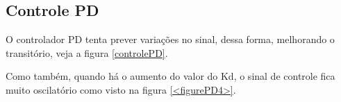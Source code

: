 \documentclass[a4paper,12pt]{article}
\begin{document}
\subsection{Controle PD}
\hspace{4ex}O controlador PD tenta prever variações no sinal, dessa forma, melhorando o transitório, veja a figura \ref{controlePD}.

\hspace{4ex}Como também, quando há o aumento do valor do Kd, o sinal de controle fica muito oscilatório como visto na figura \ref{<figurePD4>}.
\begin{figure}[H]
     \centering
     \hspace{4ex}
     \\
     \hspace{4ex}
     \\

\end{figure}
\end{document}
